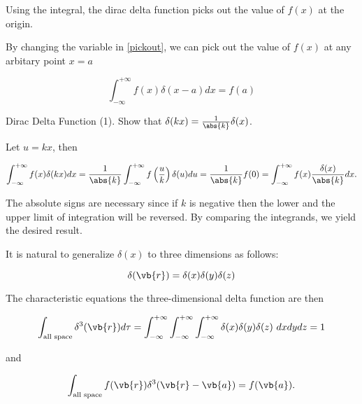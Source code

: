 \documentclass[english,a4paper,12pt]{report}
\begin{document}
Using the integral, the dirac delta function picks out the value of \(f(x)\) at the origin.
	
By changing the variable in \cref{pickout}, we can pick out the value of \(f(x)\) at any arbitary point \(x = a\)
	
\begin{equation} 
	\int_{-\infty}^{+\infty} f(x) \delta(x-a) dx = f(a) 
\end{equation}
	
\example
{Dirac Delta Function (1).}
{Show that \(\delta(kx) = \frac{1}{\abs{k}}\delta(x)\).}
{Let \(u = kx\), then 
			
\begin{equation} 
	\int_{-\infty}^{+\infty} f(x) \delta(kx) dx = \frac{1}{\abs{k} }  \int_{-\infty}^{+\infty} f\left(\frac{u}{k}\right) \delta(u) du = \frac{1}{\abs{k}} f(0) = \int_{-\infty}^{+\infty} f(x) \frac{\delta(x)}{\abs{k}} dx.
\end{equation}
			
The absolute signs are necessary since if \(k\) is negative then the lower and the upper limit of integration will be reversed. By comparing the integrands, we yield the desired result.}	
		


It is natural to generalize \(\delta(x)\) to three dimensions as follows:
	
\begin{equation} 
	\delta(\vb{r}) = \delta(x)\delta(y)\delta(z) 
\end{equation}
	
The characteristic equations the three-dimensional delta function are then 
	

\begin{equation} 
	\int_{\text{all space} } \delta^3(\vb{r})
	d\tau = \int_{-\infty}^{+\infty}\int_{-\infty}^{+\infty}\int_{-\infty}^{+\infty} \delta(x)\delta(y)\delta(z) ~dxdydz = 1 
\end{equation}
	
and
	
\begin{equation} 
	\int_{\text{all space} } f(\vb{r}) \delta^3(\vb{r} - \vb{a}) = f(\vb{a}). 
\end{equation} 
	
\end{document}
